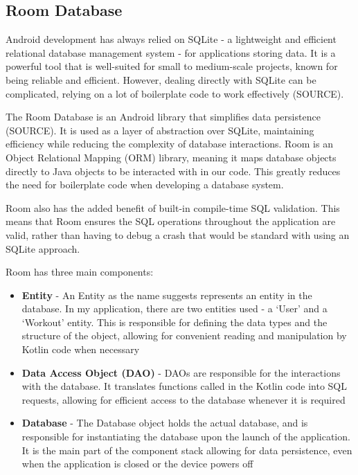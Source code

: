 \documentclass{l4proj}
\begin{document}
\subsection{Room Database}

Android development has always relied on SQLite - a lightweight and efficient relational database management system - for applications storing data. It is a powerful tool that is well-suited for small to medium-scale projects, known for being reliable and efficient. However, dealing directly with SQLite can be complicated, relying on a lot of boilerplate code to work effectively (SOURCE).

The Room Database is an Android library that simplifies data persistence (SOURCE). It is used as a layer of abstraction over SQLite, maintaining efficiency while reducing the complexity of database interactions. Room is an Object Relational Mapping (ORM) library, meaning it maps database objects directly to Java objects to be interacted with in our code. This greatly reduces the need for boilerplate code when developing a database system. 

Room also has the added benefit of built-in compile-time SQL validation. This means that Room ensures the SQL operations throughout the application are valid, rather than having to debug a crash that would be standard with using an SQLite approach.

Room has three main components:

\begin{itemize}
    \item \textbf{Entity} - An Entity as the name suggests represents an entity in the database. In my application, there are two entities used - a ‘User’ and a ‘Workout’ entity. This is responsible for defining the data types and the structure of the object, allowing for convenient reading and manipulation by Kotlin code when necessary
    \item \textbf{Data Access Object (DAO)} - DAOs are responsible for the interactions with the database. It translates functions called in the Kotlin code into SQL requests, allowing for efficient access to the database whenever it is required
    \item \textbf{Database} - The Database object holds the actual database, and is responsible for instantiating the database upon the launch of the application. It is the main part of the component stack allowing for data persistence, even when the application is closed or the device powers off
\end{itemize}
\end{document}
